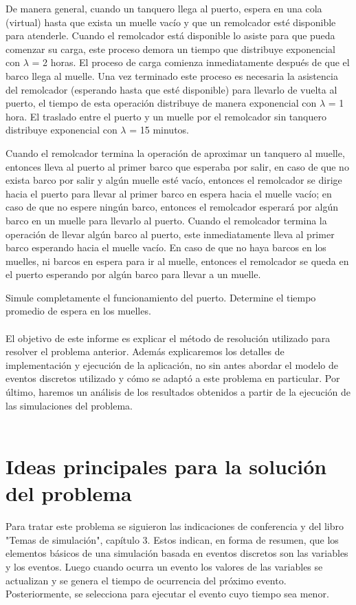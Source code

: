 \documentclass[twoside]{article}
\begin{document}
De manera general, cuando un tanquero llega al puerto, espera en una cola
(virtual) hasta que exista un muelle vac\'io y que un remolcador est\'e disponible
para atenderle. Cuando el remolcador est\'a disponible lo asiste para que pueda
comenzar su carga, este proceso demora un tiempo que distribuye exponencial
con $\lambda$ = 2 horas. El proceso de carga comienza inmediatamente despu\'es de que
el barco llega al muelle. Una vez terminado este proceso es necesaria la asistencia
del remolcador (esperando hasta que est\'e disponible) para llevarlo de vuelta al
puerto, el tiempo de esta operaci\'on distribuye de manera exponencial con $\lambda$ = 1
hora. El traslado entre el puerto y un muelle por el remolcador sin tanquero
distribuye exponencial con $\lambda$ = 15 minutos.

Cuando el remolcador termina la operaci\'on de aproximar un tanquero al
muelle, entonces lleva al puerto al primer barco que esperaba por salir, en caso de
que no exista barco por salir y alg\'un muelle est\'e vac\'io, entonces el remolcador se
dirige hacia el puerto para llevar al primer barco en espera hacia el muelle vac\'io;
en caso de que no espere ning\'un barco, entonces el remolcador esperar\'a por alg\'un barco en un muelle para llevarlo al puerto. Cuando el remolcador termina
la operaci\'on de llevar alg\'un barco al puerto, este inmediatamente lleva al primer
barco esperando hacia el muelle vac\'io. En caso de que no haya barcos en los
muelles, ni barcos en espera para ir al muelle, entonces el remolcador se queda
en el puerto esperando por alg\'un barco para llevar a un muelle.

Simule completamente el funcionamiento del puerto. Determine el tiempo
promedio de espera en los muelles. \\\\

El objetivo de este informe es explicar el m\'etodo de resoluci\'on utilizado para resolver el problema anterior. Adem\'as explicaremos los detalles de implementaci\'on y ejecuci\'on de la aplicaci\'on, no sin antes abordar el modelo de eventos discretos utilizado y c\'omo se adapt\'o a este problema en particular. Por \'ultimo, haremos un an\'alisis de los resultados obtenidos a partir de la ejecuci\'on de las simulaciones del problema.\\\\

\section{Ideas principales para la soluci\'on del problema}
Para tratar este problema se siguieron las indicaciones de conferencia y del libro "Temas de simulaci\'on", cap\'itulo 3. Estos indican, en forma de resumen, que los elementos b\'asicos de una simulaci\'on basada en eventos discretos son las variables y los eventos. Luego cuando ocurra un evento los valores de las variables se actualizan y se genera el tiempo de ocurrencia del pr\'oximo evento. Posteriormente, se selecciona para ejecutar el evento cuyo tiempo sea menor.\\
\end{document}
